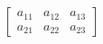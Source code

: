 \documentclass[preview]{standalone}
\begin{document}
\begin{align*}
\begin{bmatrix} a_{11} & a_{12} & a_{13} \\ a_{21} & a_{22} & a_{23} \end{bmatrix}
\end{align*}
\end{document}
